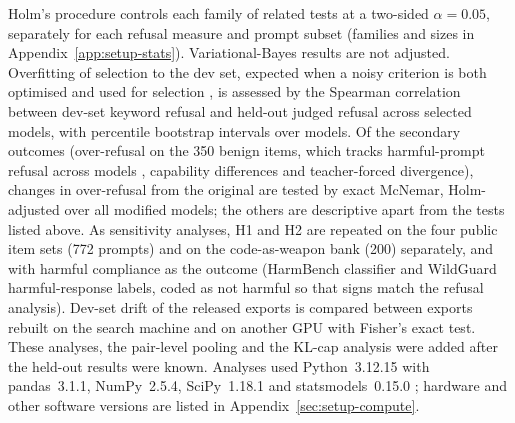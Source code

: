 Holm's procedure \cite{holm1979simple} controls each family of related tests
at a two-sided $\alpha=0.05$, separately for each refusal measure and prompt
subset (families and sizes in Appendix~\ref{app:setup-stats}).
Variational-Bayes results are not adjusted. Overfitting of selection to the
dev set, expected when a noisy criterion is both optimised and used for
selection \cite{cawley2010overfitting}, is assessed by the Spearman
correlation between dev-set keyword refusal and held-out judged refusal across
selected models, with percentile bootstrap intervals over models. Of the
secondary outcomes (over-refusal on the 350 benign items, which tracks
harmful-prompt refusal across models \cite{cui2025orbench}, capability
differences and teacher-forced divergence), changes in over-refusal from the
original are tested by exact McNemar, Holm-adjusted over all modified models;
the others are descriptive apart from the tests listed above. As
sensitivity analyses, H1 and H2 are repeated on the four public item sets
(772 prompts) and on the code-as-weapon bank (200) separately, and with
harmful compliance as the outcome (HarmBench classifier and WildGuard
harmful-response labels, coded as not harmful so that signs match the refusal
analysis). Dev-set drift of the released exports is compared between exports
rebuilt on the search machine and on another GPU with Fisher's exact test.
These analyses, the pair-level pooling and the KL-cap analysis were added
after the held-out results were known. Analyses used
Python~3.12.15 with pandas~3.1.1, NumPy~2.5.4, SciPy~1.18.1 and
statsmodels~0.15.0 \cite{seabold2010statsmodels}; hardware and other software
versions are listed in Appendix~\ref{sec:setup-compute}.

